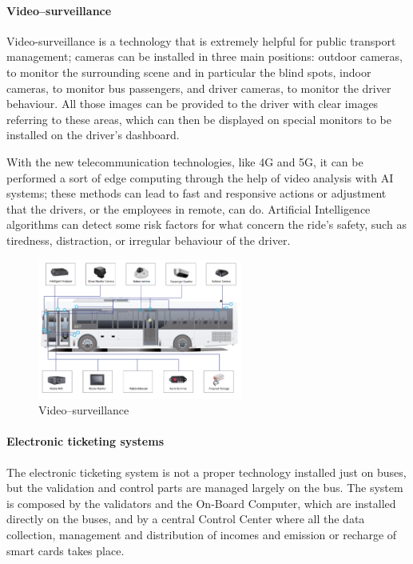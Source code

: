 \paragraph{Video–surveillance }
Video-surveillance is a technology that is extremely helpful for public transport management; cameras can be installed in three main positions: outdoor cameras, to monitor the surrounding scene and in particular the blind spots, indoor cameras, to monitor bus passengers, and driver cameras, to monitor the driver behaviour. All those images can be provided to the driver with clear images referring to these areas, which can then be displayed on special monitors to be installed on the driver's dashboard. 

With the new telecommunication technologies, like 4G and 5G, it can be performed a sort of edge computing through the help of video analysis with AI systems; these methods can lead to fast and responsive actions or adjustment that the drivers, or the employees in remote, can do. Artificial Intelligence algorithms can detect some risk factors for what concern the ride’s safety, such as tiredness, distraction, or irregular behaviour of the driver.

\begin{figure}[h!]
    \centering
    \includegraphics[width=0.6\textwidth]{Images/New Technologies/VIDEOSURV.PNG}
    \caption{Video–surveillance\cite{videosurvimage}}
    \label{fig:vs}
\end{figure}


\paragraph{Electronic ticketing systems}
The electronic ticketing system is not a proper technology installed just on buses, but the validation and control parts are managed largely on the bus. The system is composed by the validators and the On-Board Computer, which are installed directly on the buses, and by a central Control Center where all the data collection, management and distribution of incomes and emission or recharge of smart cards takes place.

